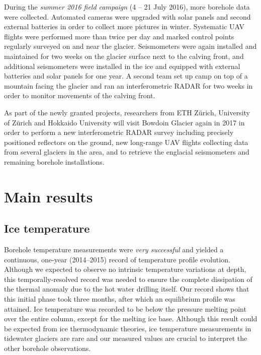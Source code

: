 \documentclass{article}
\begin{document}
During the \emph{summer 2016 field campaign} (4 -- 21 July 2016), more borehole
data were collected. Automated cameras were upgraded with solar panels and
second external batteries in order to collect more pictures in winter.
Systematic UAV flights were performed more than twice per day and marked
control points regularly surveyed on and near the glacier. Seismometers were
again installed and maintained for two weeks on the glacier surface next to the
calving front, and additional seismometers were installed in the ice and
equipped with external batteries and solar panels for one year. A second team
set up camp on top of a mountain facing the glacier and ran an interferometric
RADAR for two weeks in order to monitor movements of the calving front.

As part of the newly granted projects, researchers from ETH Zürich, University
of Zürich and Hokkaido University will visit Bowdoin Glacier again in 2017 in
order to perform a new interferometric RADAR survey including precisely
positioned reflectors on the ground, new long-range UAV flights collecting data
from several glaciers in the area, and to retrieve the englacial seismometers
and remaining borehole installations.


\section{Main results}

\subsection{Ice temperature}

Borehole temperature measurements were \emph{very successful} and yielded a
continuous, one-year (2014--2015) record of temperature profile evolution.
Although we expected to observe no intrinsic temperature variations at depth,
this temporally-resolved record was needed to ensure the complete dissipation
of the thermal anomaly due to the hot water drilling itself. Our record shows
that this initial phase took three months, after which an equilibrium profile
was attained. Ice temperature was recorded to be below the pressure melting
point over the entire column, except for the melting ice base. Although this
result could be expected from ice thermodynamic theories, ice temperature
measurements in tidewater glaciers are rare and our measured values are crucial
to interpret the other borehole observations.
\end{document}
